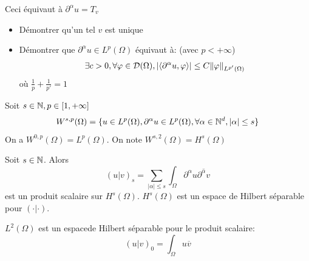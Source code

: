 \documentclass[]{report}
\begin{document}
    \begin{re}{}{}
        Ceci équivaut à $\partial^\alpha u =T_v$
    \end{re}

    \begin{exo}{}{}
        \begin{itemize}
            \item Démontrer qu'un tel $v$ est unique
            \item Démontrer que $\partial^\alpha u\in L^p(\Omega)$ équivaut à: (avec $p<+\infty$)
            \[\exists c>0,\forall \varphi\in \mathcal{D}(\Omega), |\langle \partial^\alpha u,\varphi \rangle|\le C\lVert \varphi \rVert_{L^{p'}(\Omega)}\]
            où $\frac{1}{p}+\frac{1}{p'}=1$
        \end{itemize}
    \end{exo}

    \begin{df}{}{}
        Soit $s\in \mathbb{N},p\in [1,+\infty]$
        \[W^{s,p}(\Omega)=\{u\in L^p(\Omega),\partial^\alpha u\in L^p(\Omega),\forall \alpha\in \mathbb{N}^d,|\alpha|\le s\}\]
        On a $W^{0,p}(\Omega)=L^p(\Omega)$. On note $W^{s,2}(\Omega)=H^s(\Omega)$
    \end{df}

    \begin{tm}{}{}
        Soit $s\in \mathbb{N}$. Alors
        \[(u|v)_s=\sum_{|\alpha|\le s}\int_{\Omega}\partial^\alpha u\overline{\partial^\alpha v}\]
        est un produit scalaire sur $H^s(\Omega)$. $H^s(\Omega)$ est un espace de Hilbert séparable pour $(\cdot|\cdot)$.
    \end{tm}

    \begin{ra}{}{}
        $L^2(\Omega)$ est un espacede Hilbert séparable pour le produit scalaire:
        \[(u|v)_0=\int_{\Omega} u\overline{v}\]
    \end{ra}
\end{document}
